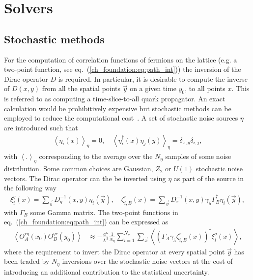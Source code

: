 
\chapter{Solvers}
\label{appex_solvers}

\section{Stochastic methods}

For the computation of correlation functions of fermions on the lattice (e.g. a two-point function, see eq.~(\ref{ch_foundation:eq:path_int})) the inversion of the Dirac operator $D$ is required. In particular, it is desirable to compute the inverse of $D(x,y)$ from all the spatial points $\vec{y}$ on a given time $y_0$, to all points $x$. This is referred to as computing a time-slice-to-all quark propagator. An exact calculation would be prohibitively expensive but stochastic methods can be employed to reduce the computational cost~\citep{Luscher:2010ae}. A set of stochastic noise sources $\eta$ are introduced such that
\begin{gather}
\left<\eta_i(x)\right>_{\eta}=0, \quad \left<\eta_i^{\dagger}(x)\eta_j(y)\right>_{\eta}=\delta_{x,y}\delta_{i,j},
\end{gather}
with $\left<.\right>_{\eta}$ corresponding to the average over the $N_{\eta}$ samples of some noise distribution. Some common choices are Gaussian, $Z_2$ or $U(1)$ stochastic noise vectors. The Dirac operator can the be inverted using $\eta$ as part of the source in the following way
\begin{gather}
\xi_i^q(x)=\sum_{\vec{y}}D^{-1}_q(x,y)\eta_i(\vec{y}), \quad \zeta_{i,B}^r(x)=\sum_{\vec{y}}D^{-1}_r(x,y)\gamma_5\Gamma_B^{\dagger}\eta_i(\vec{y}),
\end{gather}
with $\Gamma_B$ some Gamma matrix. The two-point functions in eq.~(\ref{ch_foundation:eq:path_int}) can be expressed as
\begin{align}
\left<O^{rq}_A(x_0)O^{qr}_B(y_0)\right>&\approx -\frac{a^6}{L^3}\frac{1}{N_{\eta}}\sum_{i=1}^{N_{\eta}}\sum_{\vec{x}}\left<(\Gamma_A\gamma_5\zeta^r_{i,B}(x))^{\dagger}\xi^q_i(x)\right>,
\end{align}
where the requirement to invert the Dirac operator at every spatial point $\vec{y}$ has been traded by $N_\eta$ inversions over the stochastic noise vectors at the cost of introducing an additional contribution to the statistical uncertainty. 

